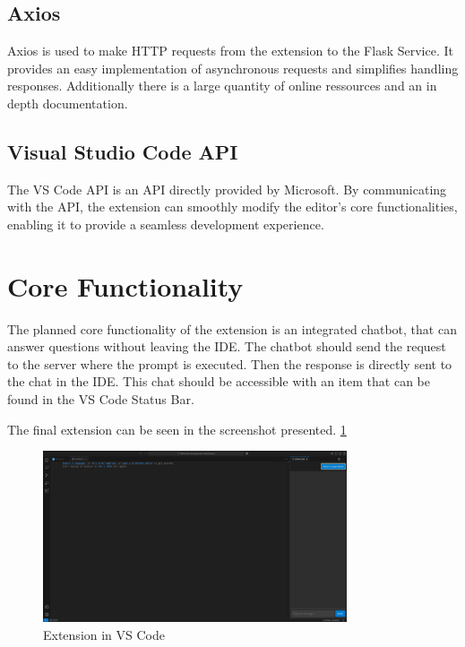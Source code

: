 \subsection{Axios}

Axios is used to make HTTP requests from the extension to the Flask Service. It provides an easy implementation of asynchronous requests and simplifies handling responses. Additionally there is a large quantity of online ressources and an in depth documentation.

\subsection{Visual Studio Code API}

The VS Code API is an API directly provided by Microsoft. By communicating with the API, the extension can smoothly modify the editor's core functionalities, enabling it to provide a seamless development experience.

\section{Core Functionality}
The planned core functionality of the extension is an integrated chatbot, that can answer questions without leaving the IDE. 
The chatbot should send the request to the server where the prompt is executed. Then the response is directly sent to the chat in the IDE. 
This chat should be accessible with an item that can be found in the VS Code Status Bar. 

The final extension can be seen in the screenshot presented. \ref{fig:Extension_in_VS_Code}

\begin{figure}[H]
  \centering
  \includegraphics[width=0.8\textwidth]{figures/Extension.png}
  \caption{Extension in VS Code}
  \label{fig:Extension_in_VS_Code}
\end{figure}





